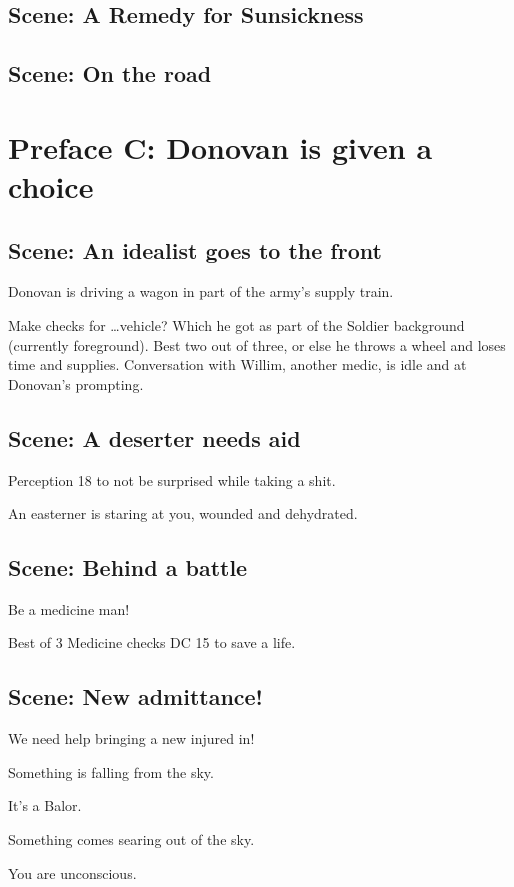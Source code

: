 \documentclass{report}
\begin{document}
  \subsection{Scene: A Remedy for Sunsickness}
  \subsection{Scene: On the road}

  \section{Preface C: Donovan is given a choice}\label{sec:prefaceC:DonovanIsGivenAChoice}
  \subsection{Scene: An idealist goes to the front}
  Donovan is driving a wagon in part of the army's supply train.

  Make checks for \ldots vehicle?
  Which he got as part of the Soldier background (currently foreground).
  Best two out of three, or else he throws a wheel and loses time and supplies.
  Conversation with Willim, another medic, is idle and at Donovan's prompting.

  \subsection{Scene: A deserter needs aid}
  Perception 18 to not be surprised while taking a shit.

  An easterner is staring at you, wounded and dehydrated.

  \subsection{Scene: Behind a battle}
  Be a medicine man!

  Best of 3 Medicine checks DC 15 to save a life.

  \subsection{Scene: New admittance!}
  We need help bringing a new injured in!

  Something is falling from the sky.

  It's a Balor.

  Something comes searing out of the sky.

  You are unconscious.
\end{document}
